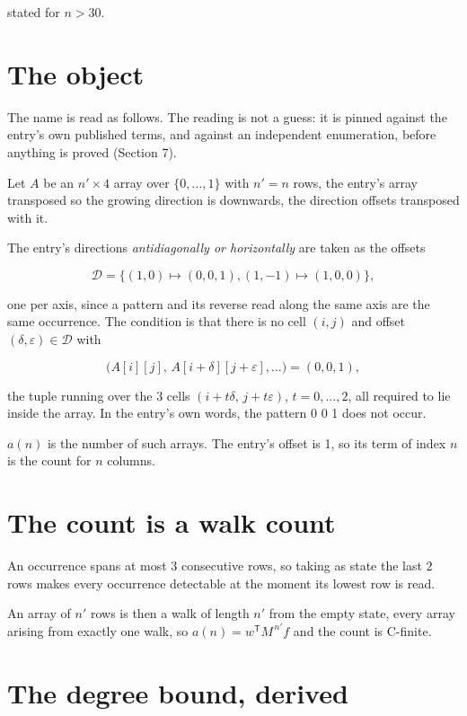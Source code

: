 \documentclass[11pt]{article}
\theoremstyle{definition}
\begin{document}
stated for $n > 30$.

\section{The object}

The name is read as follows. The reading is not a guess: it is pinned against the entry's own published terms, and against an independent enumeration, before anything is proved (Section 7).

Let $A$ be an $n' \times 4$ array over $\{0,\dots,1\}$ with $n' = n$ rows, the entry's array transposed so the growing direction is downwards, the direction offsets transposed with it.

The entry's directions {\itshape antidiagonally or horizontally} are taken as the offsets

\[\mathcal{D} = \{(1,0)\mapsto(0,0,1), (1,-1)\mapsto(1,0,0)\},\]

one per axis, since a pattern and its reverse read along the same axis are the same occurrence. The condition is that there is no cell $(i,j)$ and offset $(\delta,\varepsilon)\in\mathcal{D}$ with

\[\bigl(A[i][j],\,A[i{+}\delta][j{+}\varepsilon],\dots\bigr) = (0, 0, 1),\]

the tuple running over the $3$ cells $(i+t\delta,\,j+t\varepsilon)$, $t = 0,\dots,2$, all required to lie inside the array. In the entry's own words, the pattern 0 0 1 does not occur.

$a(n)$ is the number of such arrays. The entry's offset is 1, so its term of index $n$ is the count for $n$ columns.

\section{The count is a walk count}

An occurrence spans at most $3$ consecutive rows, so taking as state the last $2$ rows makes every occurrence detectable at the moment its lowest row is read.

An array of $n'$ rows is then a walk of length $n'$ from the empty state, every array arising from exactly one walk, so $a(n) = w^{\mathsf T}M^{\,n'}f$ and the count is C-finite.

\section{The degree bound, derived}
\end{document}

